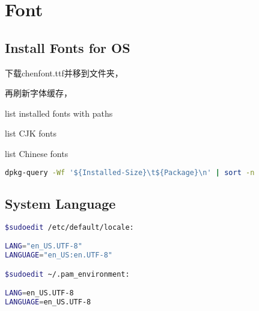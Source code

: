 \chapter{Font}



\section{Install Fonts for OS}


下载chenfont.ttf并移到文件夹，


再刷新字体缓存，




 list installed fonts with paths

 list CJK fonts

 list Chinese fonts


\begin{lstlisting}[language=bash, caption={show the installed package size}]
dpkg-query -Wf '${Installed-Size}\t${Package}\n' | sort -n
\end{lstlisting}

\section{System Language}

\begin{lstlisting}[language=bash, caption={Change System Language}]
$sudoedit /etc/default/locale:

LANG="en_US.UTF-8"
LANGUAGE="en_US:en.UTF-8"

$sudoedit ~/.pam_environment:

LANG=en_US.UTF-8
LANGUAGE=en_US.UTF-8
\end{lstlisting}







